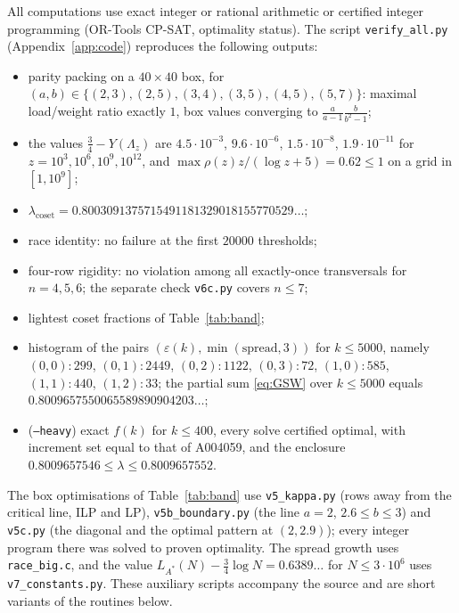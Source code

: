 \documentclass[11pt]{amsart}
\theoremstyle{definition}
\newcommand{\lamc}{\lambda_{\mathrm{coset}}}
\begin{document}
All computations use exact integer or rational arithmetic or certified integer programming (OR-Tools CP-SAT, optimality status). The script \texttt{verify\_all.py} (Appendix~\ref{app:code}) reproduces the following outputs:
\begin{itemize}[leftmargin=2em]
\item[S1] parity packing on a $40\times40$ box, for $(a,b)\in\{(2,3),(2,5),(3,4),(3,5),(4,5),(5,7)\}$: maximal load/weight ratio exactly $1$, box values converging to $\frac a{a-1}\frac b{b^2-1}$;
\item[S2] the values $\tfrac34-Y(\Lambda_z)$ are $4.5\cdot10^{-3}$, $9.6\cdot10^{-6}$, $1.5\cdot10^{-8}$, $1.9\cdot10^{-11}$ for $z=10^3,10^6,10^9,10^{12}$, and $\max\rho(z)z/(\log z+5)=0.62\le1$ on a grid in $[1,10^9]$;
\item[S3] $\lamc=0.8003091375715491181329018155770529\ldots$;
\item[S4] race identity: no failure at the first $20000$ thresholds;
\item[S5] four-row rigidity: no violation among all exactly-once transversals for $n=4,5,6$; the separate check \texttt{v6c.py} covers $n\le7$;
\item[S6] lightest coset fractions of Table~\ref{tab:band};
\item[S7] histogram of the pairs $(\varepsilon(k),\min(\text{spread},3))$ for $k\le5000$, namely $(0,0)\colon 299$, $(0,1)\colon 2449$, $(0,2)\colon 1122$, $(0,3)\colon 72$, $(1,0)\colon 585$, $(1,1)\colon 440$, $(1,2)\colon 33$; the partial sum \eqref{eq:GSW} over $k\le5000$ equals $0.8009657550065589890904203\ldots$;
\item[S8] (\texttt{--heavy}) exact $f(k)$ for $k\le400$, every solve certified optimal, with increment set equal to that of A004059, and the enclosure $0.8009657546\le\lambda\le0.8009657552$.
\end{itemize}
The box optimisations of Table~\ref{tab:band} use \texttt{v5\_kappa.py} (rows away from the critical line, ILP and LP), \texttt{v5b\_boundary.py} (the line $a=2$, $2.6\le b\le3$) and \texttt{v5c.py} (the diagonal and the optimal pattern at $(2,2.9)$); every integer program there was solved to proven optimality. The spread growth uses \texttt{race\_big.c}, and the value $L_{A^\ast}(N)-\frac34\log N=0.6389\ldots$ for $N\le3\cdot10^6$ uses \texttt{v7\_constants.py}. These auxiliary scripts accompany the source and are short variants of the routines below.

\appendix
\end{document}
